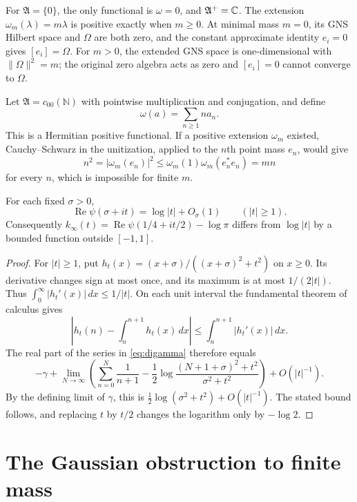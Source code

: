 For $\mathfrak A=\{0\}$, the only functional is $\omega=0$, and
$\mathfrak A^+=\mathbb C$.  The extension $\omega_m(\lambda)=m\lambda$
is positive exactly when $m\geq0$.
At minimal mass $m=0$, its GNS Hilbert space and $\Omega$ are both zero,
and the constant approximate identity $e_i=0$ gives $[e_i]=\Omega$.
For $m>0$, the extended GNS space is one-dimensional with
$\|\Omega\|^2=m$; the original zero algebra acts as zero and
$[e_i]=0$ cannot converge to $\Omega$.

\begin{example}
Let $\mathfrak A=c_{00}(\mathbb N)$ with pointwise multiplication and
conjugation, and define
\[
 \omega(a)=\sum_{n\geq1}n a_n.
\]
This is a Hermitian positive functional.  If a positive extension
$\omega_m$ existed, Cauchy--Schwarz in the unitization, applied to the
$n$th point mass $e_n$, would give
\[
 n^2=|\omega_m(e_n)|^2
 \leq\omega_m(1)\omega_m(e_n^*e_n)=mn
\]
for every $n$, which is impossible for finite $m$.
\end{example}


\begin{lemma}
\label{lem:gamma-log-size}
For each fixed $\sigma>0$,
\[
 \operatorname{Re}\psi(\sigma+it)=\log|t|+O_\sigma(1)
 \qquad(|t|\geq1).
\]
Consequently $k_\infty(t)=\operatorname{Re}\psi(1/4+it/2)-\log\pi$
differs from $\log|t|$ by a bounded function outside $[-1,1]$.
\end{lemma}

\begin{proof}
For $|t|\geq1$, put
$h_t(x)=(x+\sigma)/((x+\sigma)^2+t^2)$ on $x\geq0$.
Its derivative changes sign at most once, and its maximum is at most
$1/(2|t|)$.  Thus $\int_0^\infty|h_t'(x)|\,dx\leq1/|t|$.
On each unit interval the fundamental theorem of calculus gives
\[
 \left|h_t(n)-\int_n^{n+1}h_t(x)\,dx\right|
 \leq\int_n^{n+1}|h_t'(x)|\,dx.
\]
The real part of the series in \eqref{eq:digamma} therefore equals
\[
 -\gamma+\lim_{N\to\infty}
 \left(\sum_{n=0}^N\frac1{n+1}
 -\frac12\log\frac{(N+1+\sigma)^2+t^2}{\sigma^2+t^2}\right)
 +O(|t|^{-1}).
\]
By the defining limit of $\gamma$, this is
$\tfrac12\log(\sigma^2+t^2)+O(|t|^{-1})$.
The stated bound follows, and replacing $t$ by $t/2$ changes the logarithm
only by $-\log2$.
\end{proof}

\section{The Gaussian obstruction to finite mass}
\label{sec:weil-mass}

